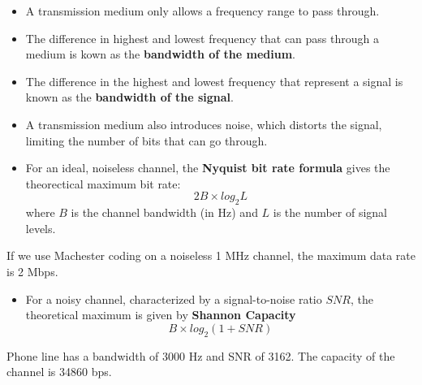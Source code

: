 \begin{cf}{

}
\end{cf}

\begin{cf}{\small
	\begin{itemize}
	\item A transmission medium only allows a frequency range to pass through.
	\item The difference in highest and lowest frequency that can pass through a medium is kown as the \textbf{bandwidth of the medium}.
	\item The difference in the highest and lowest frequency that represent a signal is known as the \textbf{bandwidth of the signal}.
	\end{itemize}
}
\end{cf}

\begin{cf}{\small
	\begin{itemize}
	\item A transmission medium also introduces noise, which distorts the signal, limiting the number of bits that can go through.
	\item For an ideal, noiseless channel, the \textbf{Nyquist bit rate formula} gives the theorectical maximum bit rate:
	\[
	2 B \times log_2 L
	\]
	where $B$ is the channel bandwidth (in Hz) and $L$ is the number of signal levels.
	\end{itemize}
}
\end{cf}

\begin{cf}[t]{\small
	If we use Machester coding on a noiseless 1 MHz channel, the maximum data rate is 2 Mbps.
}
\end{cf}

\begin{cf}{\small
	\begin{itemize}
	\item For a noisy channel, characterized by a signal-to-noise ratio $SNR$, the theoretical maximum is given by \textbf{Shannon Capacity}
	\[
	B \times log_2 ( 1 + SNR )
	\]
	\end{itemize}
}
\end{cf}

\begin{cf}[t]{\small
	Phone line has a bandwidth of 3000 Hz and SNR of 3162.  The capacity of the channel is 34860 bps.
}
\end{cf}

